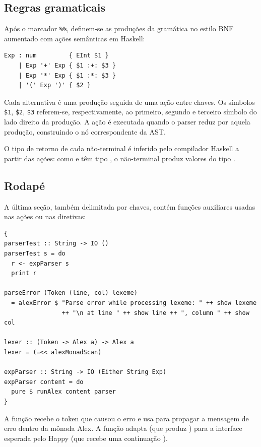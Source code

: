 \subsection{Regras gramaticais}

Após o marcador \verb|%%|, definem-se as
produções da gramática no estilo BNF aumentado com ações semânticas em Haskell:

\begin{verbatim}
Exp : num         { EInt $1 }
    | Exp '+' Exp { $1 :+: $3 }
    | Exp '*' Exp { $1 :*: $3 }
    | '(' Exp ')' { $2 }
\end{verbatim}

Cada alternativa é uma produção seguida de uma ação entre chaves. Os
símbolos \verb|$1|, \verb|$2|,
\verb|$3| referem-se, respectivamente, ao
primeiro, segundo e terceiro símbolo do lado direito da produção. A
ação é executada quando o parser reduz por aquela produção,
construindo o nó correspondente da AST.

O tipo de retorno de cada não-terminal é inferido pelo compilador
Haskell a partir das ações: como  e
 têm tipo
, o não-terminal
 produz valores do tipo
.

\subsection{Rodapé}

A última seção, também delimitada por chaves, contém funções
auxiliares usadas nas ações ou nas diretivas:

\begin{verbatim}
{
parserTest :: String -> IO ()
parserTest s = do
  r <- expParser s
  print r

parseError (Token (line, col) lexeme)
  = alexError $ "Parse error while processing lexeme: " ++ show lexeme
                ++ "\n at line " ++ show line ++ ", column " ++ show col

lexer :: (Token -> Alex a) -> Alex a
lexer = (=<< alexMonadScan)

expParser :: String -> IO (Either String Exp)
expParser content = do
  pure $ runAlex content parser
}
\end{verbatim}

A função  recebe o token que
causou o erro e usa  para propagar
a mensagem de erro dentro da mônada Alex. A função
 adapta
 (que produz
) para a interface esperada pelo
Happy (que recebe uma continuação
).

